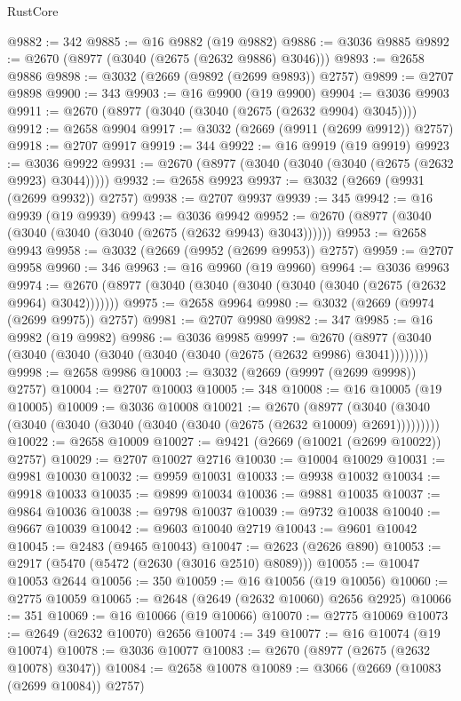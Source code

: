 \begin{lexlean}{RustCore}
\begin{coremodule}
@9882 := 342
@9885 := @16 @9882 (@19 @9882)
@9886 := @3036 @9885
@9892 := @2670 (@8977 (@3040 (@2675 (@2632 @9886) @3046)))
@9893 := @2658 @9886
@9898 := @3032 (@2669 (@9892 (@2699 @9893)) @2757)
@9899 := @2707 @9898
@9900 := 343
@9903 := @16 @9900 (@19 @9900)
@9904 := @3036 @9903
@9911 := @2670 (@8977 (@3040 (@3040 (@2675 (@2632 @9904) @3045))))
@9912 := @2658 @9904
@9917 := @3032 (@2669 (@9911 (@2699 @9912)) @2757)
@9918 := @2707 @9917
@9919 := 344
@9922 := @16 @9919 (@19 @9919)
@9923 := @3036 @9922
@9931 := @2670 (@8977 (@3040 (@3040 (@3040 (@2675 (@2632 @9923) @3044)))))
@9932 := @2658 @9923
@9937 := @3032 (@2669 (@9931 (@2699 @9932)) @2757)
@9938 := @2707 @9937
@9939 := 345
@9942 := @16 @9939 (@19 @9939)
@9943 := @3036 @9942
@9952 := @2670 (@8977 (@3040 (@3040 (@3040 (@3040 (@2675 (@2632 @9943) @3043))))))
@9953 := @2658 @9943
@9958 := @3032 (@2669 (@9952 (@2699 @9953)) @2757)
@9959 := @2707 @9958
@9960 := 346
@9963 := @16 @9960 (@19 @9960)
@9964 := @3036 @9963
@9974 := @2670 (@8977 (@3040 (@3040 (@3040 (@3040 (@3040 (@2675 (@2632 @9964) @3042)))))))
@9975 := @2658 @9964
@9980 := @3032 (@2669 (@9974 (@2699 @9975)) @2757)
@9981 := @2707 @9980
@9982 := 347
@9985 := @16 @9982 (@19 @9982)
@9986 := @3036 @9985
@9997 := @2670 (@8977 (@3040 (@3040 (@3040 (@3040 (@3040 (@3040 (@2675 (@2632 @9986) @3041))))))))
@9998 := @2658 @9986
@10003 := @3032 (@2669 (@9997 (@2699 @9998)) @2757)
@10004 := @2707 @10003
@10005 := 348
@10008 := @16 @10005 (@19 @10005)
@10009 := @3036 @10008
@10021 := @2670
    (@8977 (@3040 (@3040 (@3040 (@3040 (@3040 (@3040 (@3040 (@2675 (@2632 @10009) @2691)))))))))
@10022 := @2658 @10009
@10027 := @9421 (@2669 (@10021 (@2699 @10022)) @2757)
@10029 := @2707 @10027 @2716
@10030 := @10004 @10029
@10031 := @9981 @10030
@10032 := @9959 @10031
@10033 := @9938 @10032
@10034 := @9918 @10033
@10035 := @9899 @10034
@10036 := @9881 @10035
@10037 := @9864 @10036
@10038 := @9798 @10037
@10039 := @9732 @10038
@10040 := @9667 @10039
@10042 := @9603 @10040 @2719
@10043 := @9601 @10042
@10045 := @2483 (@9465 @10043)
@10047 := @2623 (@2626 @890)
@10053 := @2917 (@5470 (@5472 (@2630 (@3016 @2510) @8089)))
@10055 := @10047 @10053 @2644
@10056 := 350
@10059 := @16 @10056 (@19 @10056)
@10060 := @2775 @10059
@10065 := @2648 (@2649 (@2632 @10060) @2656 @2925)
@10066 := 351
@10069 := @16 @10066 (@19 @10066)
@10070 := @2775 @10069
@10073 := @2649 (@2632 @10070) @2656
@10074 := 349
@10077 := @16 @10074 (@19 @10074)
@10078 := @3036 @10077
@10083 := @2670 (@8977 (@2675 (@2632 @10078) @3047))
@10084 := @2658 @10078
@10089 := @3066 (@2669 (@10083 (@2699 @10084)) @2757)

\end{coremodule}
\end{lexlean}
